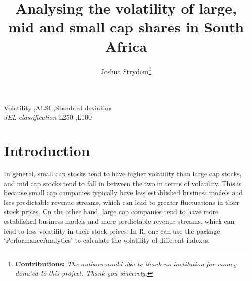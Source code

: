 \documentclass[11pt,preprint, authoryear]{elsarticle}
\numberwithin{equation}{section}
\numberwithin{figure}{section}
\numberwithin{table}{section}
\let\rmarkdownfootnote\footnote%
\def\footnote{\protect\rmarkdownfootnote}
\begin{document}
\begin{frontmatter}  %

\title{Analysing the volatility of large, mid and small cap shares in
South Africa}





\author[Add1]{Joshua Strydom\footnote{\textbf{Contributions:}
  \newline \emph{The authors would like to thank no institution for
  money donated to this project. Thank you sincerely.}}}





\address[Add1]{Stellenbosch University, Stellenbosch, South Africa}



\vspace{1cm}


\begin{keyword}
\footnotesize{
Volatility \sep ALSI \sep Standard deviation \\
\vspace{0.3cm}
}
\footnotesize{
\textit{JEL classification} L250 \sep L100
}
\end{keyword}



\vspace{0.5cm}

\end{frontmatter}



\pagestyle{fancy}
\chead{}
\rhead{}
\lfoot{}
\lhead{}
\cfoot{}


\headsep 35pt %




\hypertarget{introduction}{%
\section{\texorpdfstring{Introduction
\label{Introduction}}{Introduction }}\label{introduction}}

In general, small cap stocks tend to have higher volatility than large
cap stocks, and mid cap stocks tend to fall in between the two in terms
of volatility. This is because small cap companies typically have less
established business models and less predictable revenue streams, which
can lead to greater fluctuations in their stock prices. On the other
hand, large cap companies tend to have more established business models
and more predictable revenue streams, which can lead to less volatility
in their stock prices. In R, one can use the package
`PerformanceAnalytics' to calculate the volatility of different indexes.
\end{document}
